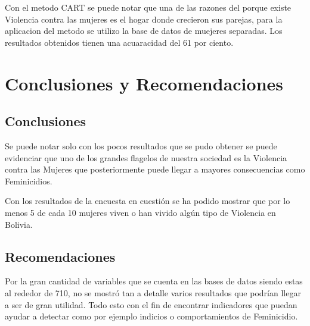 \documentclass[11pt,letter]{article}
\begin{document}
Con el metodo CART se puede notar que una de las razones del porque existe Violencia contra las mujeres es el hogar donde crecieron sus parejas, para la aplicacion del metodo se utilizo la base de datos de muejeres separadas. Los resultados obtenidos tienen una acuaracidad del 61 por ciento. 

\section{Conclusiones y Recomendaciones}

\subsection{Conclusiones}
Se puede notar solo con los pocos resultados que se pudo obtener se puede evidenciar que uno de los grandes flagelos de nuestra sociedad es la Violencia contra las Mujeres que posteriormente puede llegar a mayores consecuencias como Feminicidios. 

Con los resultados de la encuesta en cuestión se ha podido mostrar que por lo menos 5 de cada 10 mujeres viven o han vivido algún tipo de Violencia en Bolivia.

\subsection{Recomendaciones}
Por la gran cantidad de variables que se cuenta en las bases de datos siendo estas al rededor de 710, no se mostró tan a detalle varios resultados que podrían llegar a ser de gran utilidad. Todo esto con el fin de encontrar indicadores que puedan ayudar a detectar como por ejemplo indicios o comportamientos de Feminicidio.


 

\printbibliography
\end{document}
